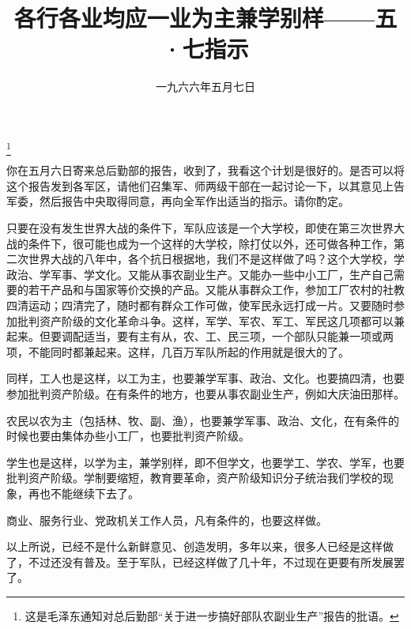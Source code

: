 
\title{各行各业均应一业为主兼学别样——五·七指示}
\date{一九六六年五月七日}
\thanks{这是毛泽东通知对总后勤部“关于进一步搞好部队农副业生产”报告的批语。}
\maketitle



你在五月六日寄来总后勤部的报告，收到了，我看这个计划是很好的。是否可以将这个报告发到各军区，请他们召集军、师两级干部在一起讨论一下，以其意见上告军委，然后报告中央取得同意，再向全军作出适当的指示。请你酌定。

只要在没有发生世界大战的条件下，军队应该是一个大学校，即使在第三次世界大战的条件下，很可能也成为一个这样的大学校，除打仗以外，还可做各种工作，第二次世界大战的八年中，各个抗日根据地，我们不是这样做了吗？这个大学校，学政治、学军事、学文化。又能从事农副业生产。又能办一些中小工厂，生产自己需要的若干产品和与国家等价交换的产品。又能从事群众工作，参加工厂农村的社教四清运动；四清完了，随时都有群众工作可做，使军民永远打成一片。又要随时参加批判资产阶级的文化革命斗争。这样，军学、军农、军工、军民这几项都可以兼起来。但要调配适当，要有主有从，农、工、民三项，一个部队只能兼一项或两项，不能同时都兼起来。这样，几百万军队所起的作用就是很大的了。

同样，工人也是这样，以工为主，也要兼学军事、政治、文化。也要搞四清，也要参加批判资产阶级。在有条件的地方，也要从事农副业生产，例如大庆油田那样。

农民以农为主（包括林、牧、副、渔），也要兼学军事、政治、文化，在有条件的时候也要由集体办些小工厂，也要批判资产阶级。

学生也是这样，以学为主，兼学别样，即不但学文，也要学工、学农、学军，也要批判资产阶级。学制要缩短，教育要革命，资产阶级知识分子统治我们学校的现象，再也不能继续下去了。

商业、服务行业、党政机关工作人员，凡有条件的，也要这样做。

以上所说，已经不是什么新鲜意见、创造发明，多年以来，很多人已经是这样做了，不过还没有普及。至于军队，已经这样做了几十年，不过现在更要有所发展罢了。

